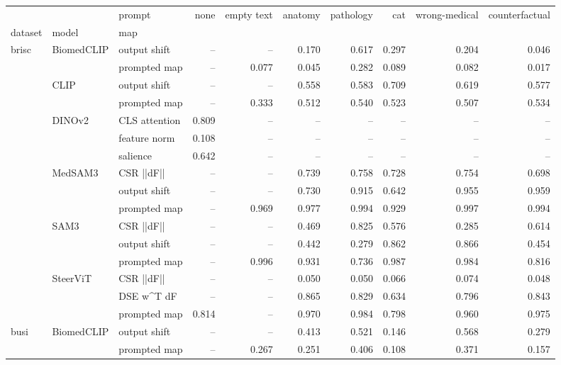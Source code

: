 \begin{tabular}{lllrrrrrrr}
\toprule
 &  & prompt & none & empty text & anatomy & pathology & cat & wrong-medical & counterfactual \\
dataset & model & map &  &  &  &  &  &  &  \\
\midrule
\multirow[t]{16}{*}{brisc} & \multirow[t]{2}{*}{BiomedCLIP} & output shift & -- & -- & 0.170 & 0.617 & 0.297 & 0.204 & 0.046 \\
 &  & prompted map & -- & 0.077 & 0.045 & 0.282 & 0.089 & 0.082 & 0.017 \\
\cline{2-10}
 & \multirow[t]{2}{*}{CLIP} & output shift & -- & -- & 0.558 & 0.583 & 0.709 & 0.619 & 0.577 \\
 &  & prompted map & -- & 0.333 & 0.512 & 0.540 & 0.523 & 0.507 & 0.534 \\
\cline{2-10}
 & \multirow[t]{3}{*}{DINOv2} & CLS attention & 0.809 & -- & -- & -- & -- & -- & -- \\
 &  & feature norm & 0.108 & -- & -- & -- & -- & -- & -- \\
 &  & salience & 0.642 & -- & -- & -- & -- & -- & -- \\
\cline{2-10}
 & \multirow[t]{3}{*}{MedSAM3} & CSR  ||dF|| & -- & -- & 0.739 & 0.758 & 0.728 & 0.754 & 0.698 \\
 &  & output shift & -- & -- & 0.730 & 0.915 & 0.642 & 0.955 & 0.959 \\
 &  & prompted map & -- & 0.969 & 0.977 & 0.994 & 0.929 & 0.997 & 0.994 \\
\cline{2-10}
 & \multirow[t]{3}{*}{SAM3} & CSR  ||dF|| & -- & -- & 0.469 & 0.825 & 0.576 & 0.285 & 0.614 \\
 &  & output shift & -- & -- & 0.442 & 0.279 & 0.862 & 0.866 & 0.454 \\
 &  & prompted map & -- & 0.996 & 0.931 & 0.736 & 0.987 & 0.984 & 0.816 \\
\cline{2-10}
 & \multirow[t]{3}{*}{SteerViT} & CSR  ||dF|| & -- & -- & 0.050 & 0.050 & 0.066 & 0.074 & 0.048 \\
 &  & DSE  w^T dF & -- & -- & 0.865 & 0.829 & 0.634 & 0.796 & 0.843 \\
 &  & prompted map & 0.814 & -- & 0.970 & 0.984 & 0.798 & 0.960 & 0.975 \\
\cline{1-10} \cline{2-10}
\multirow[t]{16}{*}{busi} & \multirow[t]{2}{*}{BiomedCLIP} & output shift & -- & -- & 0.413 & 0.521 & 0.146 & 0.568 & 0.279 \\
 &  & prompted map & -- & 0.267 & 0.251 & 0.406 & 0.108 & 0.371 & 0.157 \\

\end{tabular}
